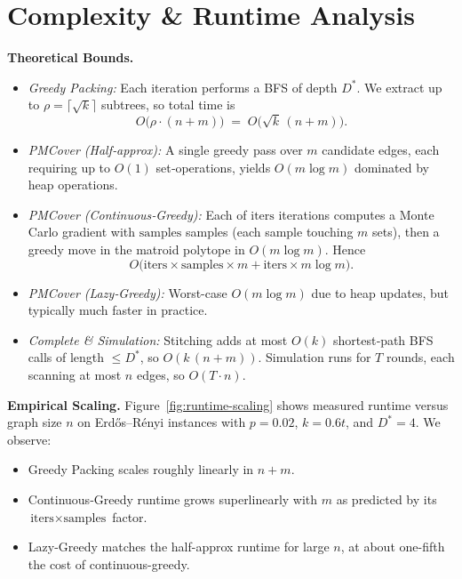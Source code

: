 \documentclass[12pt]{article}
\begin{document}
\section{Complexity \& Runtime Analysis}
\label{sec:complexity}

\noindent\textbf{Theoretical Bounds.}
\begin{itemize}
  \item \emph{Greedy Packing:}  Each iteration performs a BFS of depth \(D^*\).  We extract up to \(\rho=\lceil\sqrt{k}\rceil\) subtrees, so total time is 
    \[
      O\bigl(\rho \cdot (n + m)\bigr) \;=\; O\bigl(\sqrt{k}\,(n+m)\bigr).
    \]
  \item \emph{PMCover (Half‐approx):}  A single greedy pass over \(m\) candidate edges, each requiring up to \(O(1)\) set‐operations, yields \(O(m \log m)\) dominated by heap operations.
  \item \emph{PMCover (Continuous‐Greedy):}  Each of \(\text{iters}\) iterations computes a Monte Carlo gradient with \(\text{samples}\) samples (each sample touching \(m\) sets), then a greedy move in the matroid polytope in \(O(m\log m)\).  Hence
    \[
      O\bigl(\text{iters}\times\text{samples}\times m + \text{iters}\times m\log m\bigr).
    \]
  \item \emph{PMCover (Lazy‐Greedy):}  
    Worst-case \(O(m \log m)\) due to heap updates, but typically much faster in practice.
  \item \emph{Complete \& Simulation:}  
    Stitching adds at most \(O(k)\) shortest‐path BFS calls of length \(\le D^*\), so \(O(k\,(n+m))\).  Simulation runs for \(T\) rounds, each scanning at most \(n\) edges, so \(O(T\cdot n)\).
\end{itemize}

\noindent\textbf{Empirical Scaling.}  
Figure~\ref{fig:runtime-scaling} shows measured runtime versus graph size \(n\) on Erdős–Rényi instances with \(p=0.02\), \(k=0.6t\), and \(D^*=4\).  We observe:
\begin{itemize}
  \item Greedy Packing scales roughly linearly in \(n+m\).  
  \item Continuous‐Greedy runtime grows superlinearly with \(m\) as predicted by its \(\text{iters}\times\text{samples}\) factor.  
  \item Lazy-Greedy matches the half-approx runtime for large \(n\), at about one-fifth the cost of continuous-greedy.
\end{itemize}
\end{document}
